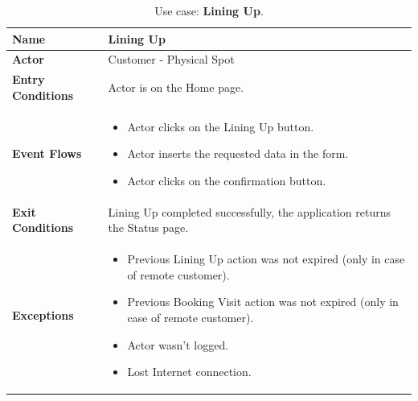 \begin{table}[H]
    \centering
    \begin{tabular}{| m{} | m{} |}
        \hline
        \textbf{Name}            & Lining Up                                                                  \\
        \hline
        \textbf{Actor}            & Customer - Physical Spot                                                   \\
        \hline
        \textbf{Entry Conditions} & Actor is on the Home page.                                                 \\
        \hline
        \textbf{Event Flows} &
        \begin{itemize}
            \item Actor clicks on the Lining Up button.
            \item Actor inserts the requested data in the form.
            \item Actor clicks on the confirmation button.
        \end{itemize} \\
        \hline
        \textbf{Exit Conditions}  & Lining Up completed successfully, the application returns the Status page. \\
        \hline
        \textbf{Exceptions} &
        \begin{itemize}
            \item Previous Lining Up action was not expired (only in case of remote customer).
            \item Previous Booking Visit action was not expired (only in case of remote customer).
            \item Actor wasn't logged.
            \item Lost Internet connection.
        \end{itemize} \\
        \hline
    \end{tabular}
    \caption{Use case: \textbf{Lining Up}.}
    \label{tableLiningUp}
\end{table}

